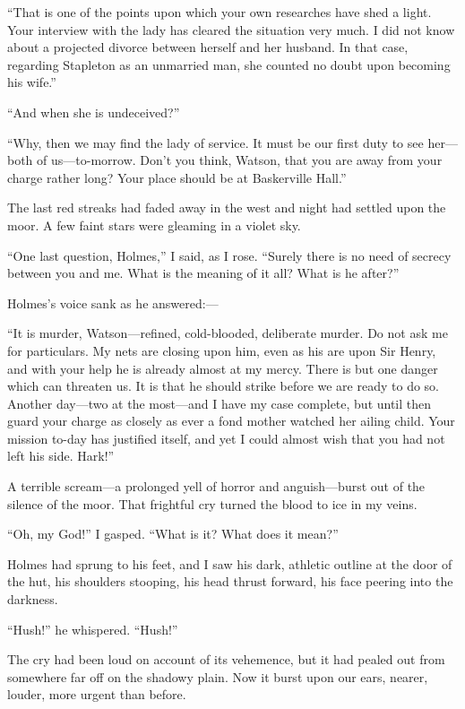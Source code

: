 \documentclass[paper=5.5in:8.5in,BCOR=7mm,twoside,DIV=calc,12pt,usegeometry,openany,chapterprefix,endperiod,headings=big]{scrbook} %
\begin{document}
\enquote{That is one of the points upon which your own researches have shed a light. Your interview with the lady has cleared the situation very much. I did not know about a projected divorce between herself and her husband. In that case, regarding Stapleton as an unmarried man, she counted no doubt upon becoming his wife.}

\enquote{And when she is undeceived?}

\enquote{Why, then we may find the lady of service. It must be our first duty to see her---both of us---to-morrow. Don't you think, Watson, that you are away from your charge rather long? Your place should be at Baskerville Hall.}

The last red streaks had faded away in the west and night had settled upon the moor. A few faint stars were gleaming in a violet sky.

\enquote{One last question, Holmes,} I said, as I rose. \enquote{Surely there is no need of secrecy between you and me. What is the meaning of it all? What is he after?}

Holmes's voice sank as he answered:--- 

\enquote{It is murder, Watson---refined, cold-blooded, deliberate mur\-der. Do not ask me for particulars. My nets are closing upon him, even as his are upon Sir Henry, and with your help he is already almost at my mercy. There is but one danger which can threaten us. It is that he should strike before we are ready to do so. Another day---two at the most---and I have my case complete, but until then guard your charge as closely as ever a fond mother watched her ailing child. Your mission to-day has justified itself, and yet I could almost wish that you had not left his side. Hark!}

A terrible scream---a prolonged yell of horror and anguish---burst out of the silence of the moor. That frightful cry turned the blood to ice in my veins.

\enquote{Oh, my God!} I gasped. \enquote{What is it? What does it mean?}

Holmes had sprung to his feet, and I saw his dark, athletic outline at the door of the hut, his shoulders stooping, his head thrust forward, his face peering into the darkness.

\enquote{Hush!} he whispered. \enquote{Hush!}

The cry had been loud on account of its vehemence, but it had pealed out from somewhere far off on the shadowy plain. Now it burst upon our ears, nearer, louder, more urgent than before.
\end{document}
